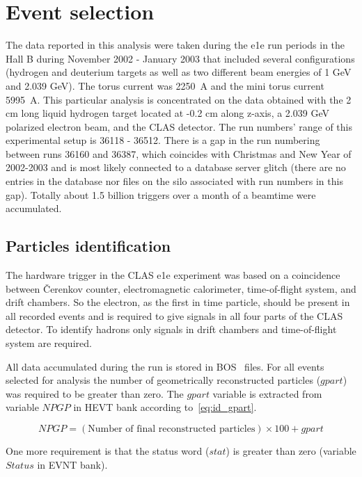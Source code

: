 \chapter{Event selection}
\label{select}

The data reported in this analysis were taken during the e1e run periods in the Hall B during November 2002 - January 2003 that included several configurations (hydrogen and deuterium targets as well as two different beam energies of 1 GeV and 2.039 GeV). The torus current was 2250~A and the mini torus current 5995~A. This particular analysis is concentrated on the data obtained with the 2 cm long liquid hydrogen target located at -0.2 cm along z-axis, a 2.039 GeV polarized electron beam, and the CLAS detector. The run numbers' range of this experimental setup is 36118 - 36512. There is a gap in the run numbering between runs 36160 and 36387, which coincides with Christmas and New Year of 2002-2003 and is most likely connected to a database server glitch (there are no entries in the database nor files on the silo associated with run numbers in this gap). Totally about 1.5 billion triggers over a month of a beamtime were accumulated.

\section{Particles identification}
\label{ident}

The hardware trigger in the CLAS e1e experiment was based on a
coincidence between \v Cerenkov counter, electromagnetic
calorimeter, time-of-flight system, and drift chambers. So the electron, as the first in time particle, should be present in all recorded events and is required to give signals in all four parts of the CLAS detector. To identify hadrons only signals in drift chambers and time-of-flight system are required.

All data accumulated during the run is stored in BOS~\cite{BOS:bank} files. For all events selected for analysis the number of geometrically reconstructed particles ($gpart$) was required to be greater than zero. The $gpart$ variable is extracted from variable $NPGP$ in HEVT bank according to~\ref{eq:id_gpart}. 

\begin{equation}
NPGP=(\text{Number of final reconstructed particles})\times100 + gpart
\label{eq:id_gpart}
\end{equation}

One more requirement is that the status word ($stat$) is greater than zero (variable $Status$ in EVNT bank).

